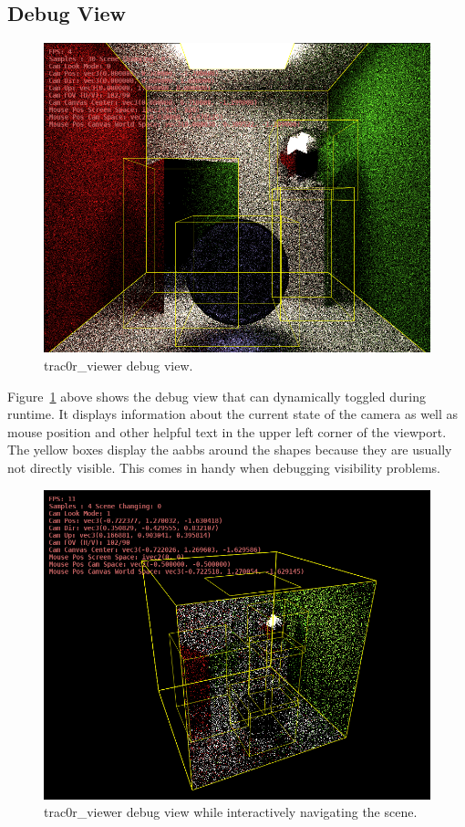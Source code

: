 \documentclass[
  twoside,
  11pt, a4paper,
  footinclude=true,
  headinclude=true,
  cleardoublepage=empty
]{scrreprt}
\begin{document}
\subsection{Debug View}
\begin{figure}[H]
    \includegraphics[scale=0.5]{trac0r-debug1.png}
    \centering
    \caption{trac0r\_viewer debug view.}
    \label{fig:trac0r_debug1}
\end{figure}

Figure~\ref{fig:trac0r_debug1} above shows the debug view that can dynamically toggled during
runtime. It displays information about the current state of the camera as well as mouse position
and other helpful text in the upper left corner of the
viewport. The yellow boxes display the \acp{aabb} around the shapes because they are usually not
directly visible. This comes in handy when debugging visibility problems.

\begin{figure}[H]
    \includegraphics[scale=0.5]{trac0r-debug2.png}
    \centering
    \caption{trac0r\_viewer debug view while interactively navigating the scene.}
    \label{fig:trac0r_debug2}
\end{figure}
\end{document}
